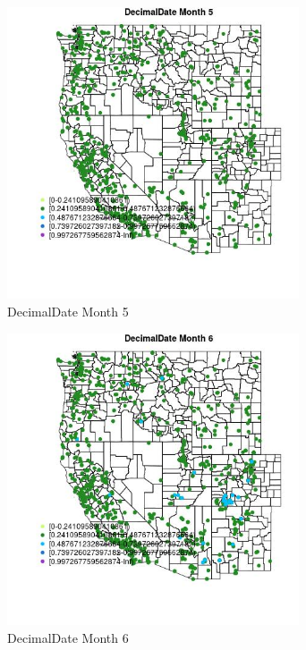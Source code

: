 \begin{figure} 
\centering  
\includegraphics[width=0.77\textwidth]{Code_Outputs/Report_ML_input_PM25_Step4_part_e_de_duplicated_aveswNAs_MapObsMo5DecimalDate.jpg} 
\caption{\label{fig:Report_ML_input_PM25_Step4_part_e_de_duplicated_aveswNAsMapObsMo5DecimalDate}DecimalDate Month 5} 
\end{figure} 
 

\begin{figure} 
\centering  
\includegraphics[width=0.77\textwidth]{Code_Outputs/Report_ML_input_PM25_Step4_part_e_de_duplicated_aveswNAs_MapObsMo6DecimalDate.jpg} 
\caption{\label{fig:Report_ML_input_PM25_Step4_part_e_de_duplicated_aveswNAsMapObsMo6DecimalDate}DecimalDate Month 6} 
\end{figure} 
 

